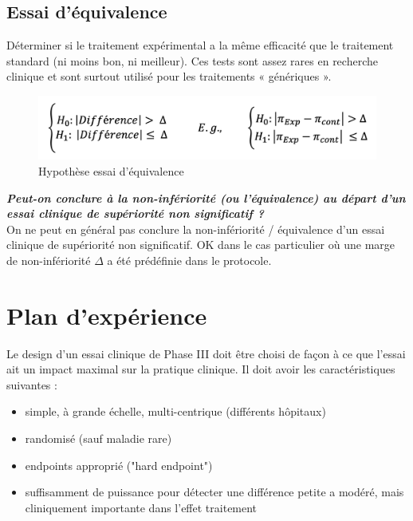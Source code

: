 \subsection{Essai d’équivalence}
Déterminer si le traitement expérimental a la même efficacité que le traitement standard (ni moins bon, ni meilleur). Ces tests sont assez rares en recherche clinique et sont surtout utilisé pour les traitements « génériques ».

\begin{figure}[H]
    \centering
    \includegraphics[scale=0.4]{images/equil.png}
    \caption{Hypothèse essai d'équivalence}
    \label{fig:essaisequi}
\end{figure}

\vspace{0.15cm}
\textbf{\textit{Peut-on conclure à la non-infériorité (ou
l’équivalence) au départ d’un essai clinique
de supériorité non significatif ?}}\\
On ne peut en général pas conclure la non-infériorité /
équivalence d’un essai clinique de supériorité non significatif. OK dans le cas particulier où une marge de non-infériorité $\Delta$ a
été prédéfinie dans le protocole.

\section{Plan d’expérience}

Le design d’un essai clinique de Phase III doit être choisi de façon à ce que l’essai ait un impact maximal sur la pratique clinique. Il doit avoir les caractéristiques suivantes :\\

\begin{itemize}
    \item simple, à grande échelle, multi-centrique (différents hôpitaux)
    \item randomisé (sauf maladie rare)
    \item endpoints approprié ("hard endpoint")
    \item suffisamment de puissance pour détecter une différence petite a modéré, mais cliniquement importante dans l’effet traitement
\end{itemize}


